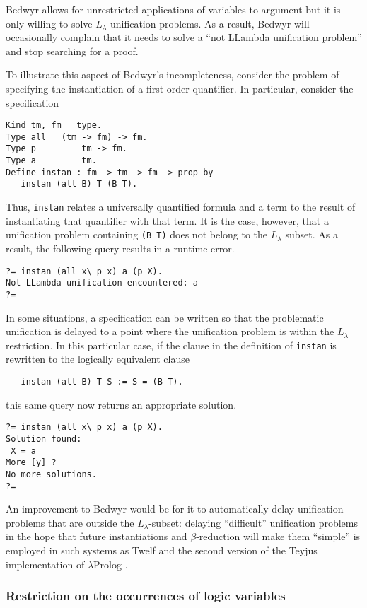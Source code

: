 \documentclass{article}
\newcommand{\lp}{$\lambda$Prolog}
\newcommand{\Ll}{$L_\lambda$}
\begin{document}
Bedwyr allows for unrestricted applications of variables to argument
but it is only willing to solve \Ll-unification problems.  As a result,
Bedwyr will occasionally complain that it needs to solve a ``not LLambda
unification problem'' and stop searching for a proof.

To illustrate this aspect of Bedwyr's incompleteness, consider the
problem of specifying the instantiation of a first-order quantifier.
In particular, consider the specification
\begin{verbatim}
Kind tm, fm   type.
Type all   (tm -> fm) -> fm.
Type p         tm -> fm.
Type a         tm.
Define instan : fm -> tm -> fm -> prop by
   instan (all B) T (B T).
\end{verbatim}
Thus, {\tt instan} relates a universally quantified formula and a term
to the result of instantiating that quantifier with that term.
It is the case, however, that a
unification problem containing \verb+(B T)+ does not belong to the
\Ll{} subset.
As a result, the following query results in a runtime error.
\begin{verbatim}
?= instan (all x\ p x) a (p X).
Not LLambda unification encountered: a
?=
\end{verbatim}
In some situations, a specification can be written so that the
problematic unification is delayed to a point where the unification
problem is within the \Ll{} restriction.  In this particular case, if
the clause in the definition of {\tt instan} is rewritten to the
logically equivalent clause
\begin{verbatim}
   instan (all B) T S := S = (B T).
\end{verbatim}
this same query now returns an appropriate solution.
\begin{verbatim}
?= instan (all x\ p x) a (p X).
Solution found:
 X = a
More [y] ?
No more solutions.
?=
\end{verbatim}
An improvement to Bedwyr would be for it to automatically delay
unification problems that are outside the \Ll-subset: delaying
``difficult'' unification problems in the hope that future
instantiations and $\beta$-reduction will make them ``simple'' is
employed in such systems as Twelf and the second version of the Teyjus
implementation of \lp{} \cite{teyjus.website}.

\subsubsection{Restriction on the occurrences of logic variables}
\label{restrict-logic-variables}
\end{document}
